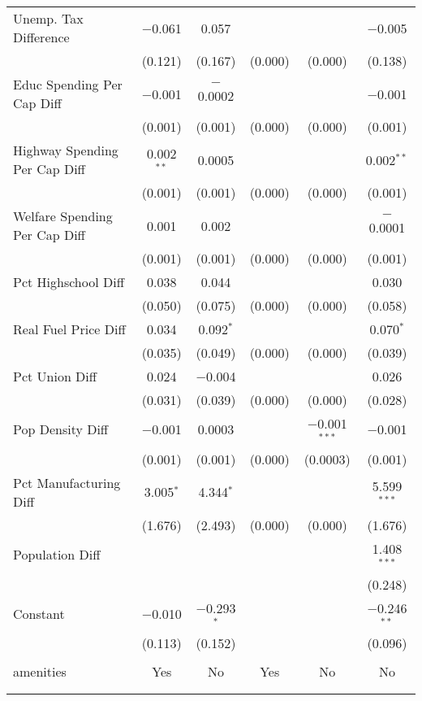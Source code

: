 \begin{table}[!htbp]
\begin{tabular}{@{\extracolsep{5pt}}lccccc}
  Unemp. Tax Difference & $-$0.061 & 0.057 &  &  & $-$0.005 \\ 
  & (0.121) & (0.167) & (0.000) & (0.000) & (0.138) \\ 
  Educ Spending Per Cap Diff & $-$0.001 & $-$0.0002 &  &  & $-$0.001 \\ 
  & (0.001) & (0.001) & (0.000) & (0.000) & (0.001) \\ 
  Highway Spending Per Cap Diff & 0.002$^{**}$ & 0.0005 &  &  & 0.002$^{**}$ \\ 
  & (0.001) & (0.001) & (0.000) & (0.000) & (0.001) \\ 
  Welfare Spending Per Cap Diff & 0.001 & 0.002 &  &  & $-$0.0001 \\ 
  & (0.001) & (0.001) & (0.000) & (0.000) & (0.001) \\ 
  Pct Highschool Diff & 0.038 & 0.044 &  &  & 0.030 \\ 
  & (0.050) & (0.075) & (0.000) & (0.000) & (0.058) \\ 
  Real Fuel Price Diff & 0.034 & 0.092$^{*}$ &  &  & 0.070$^{*}$ \\ 
  & (0.035) & (0.049) & (0.000) & (0.000) & (0.039) \\ 
  Pct Union Diff & 0.024 & $-$0.004 &  &  & 0.026 \\ 
  & (0.031) & (0.039) & (0.000) & (0.000) & (0.028) \\ 
  Pop Density Diff & $-$0.001 & 0.0003 &  & $-$0.001$^{***}$ & $-$0.001 \\ 
  & (0.001) & (0.001) & (0.000) & (0.0003) & (0.001) \\ 
  Pct Manufacturing Diff & 3.005$^{*}$ & 4.344$^{*}$ &  &  & 5.599$^{***}$ \\ 
  & (1.676) & (2.493) & (0.000) & (0.000) & (1.676) \\ 
  Population Diff &  &  &  &  & 1.408$^{***}$ \\ 
  &  &  &  &  & (0.248) \\ 
  Constant & $-$0.010 & $-$0.293$^{*}$ &  &  & $-$0.246$^{**}$ \\ 
  & (0.113) & (0.152) &  &  & (0.096) \\ 
 \hline \\[-1.8ex] 
amenities & Yes & No & Yes & No & No \\ 
\hline \\[-1.8ex] 
\hline 
\hline \\[-1.8ex] 
\end{tabular} 
\end{table} 
